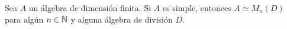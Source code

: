 %
%
\begin{theorem}[Wedderburn]
	Sea $A$ un álgebra de dimensión finita. 
	Si $A$ es simple, entonces $A\simeq M_n(D)$ para algún $n\in\mathbb{N}$ y alguna álgebra de división $D$.
\end{theorem}


